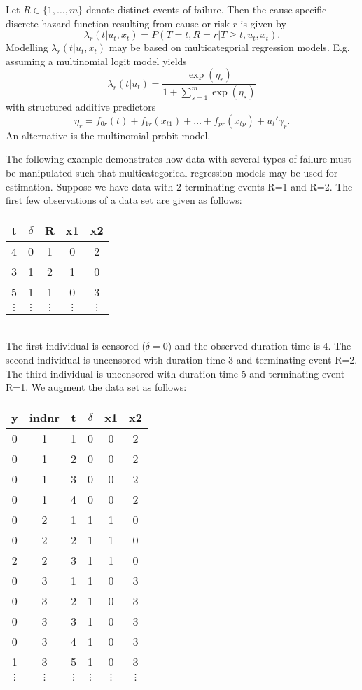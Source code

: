 Let $R \in \{1,\dots,m\}$ denote distinct events of failure. Then
the cause specific discrete hazard function resulting from cause
or risk $r$ is given by
$$
\lambda_{r}(t|u_t,x_t) = P(T=t,R=r|T \geq t, u_t,x_t).
$$
Modelling $\lambda_{r}(t|u_t,x_t)$ may be based on multicategorial
regression models. E.g. assuming a multinomial logit model yields
$$
\lambda_{r}(t|u_t) = \frac{\exp(\eta_{r})}{1+\sum_{s=1}^m
\exp(\eta_s)}
$$
with structured additive predictors
\begin{equation}
\label{gampred3} \eta_{r}=f_{0r}(t) +
f_{1r}(x_{t1})+\dots+f_{pr}(x_{tp})+u_{t}'\gamma_r.
\end{equation}
An alternative is the multinomial probit model.

The following example demonstrates how data with several types of
failure must be manipulated such that multicategorical regression
models may be used for estimation. Suppose we have data with 2
terminating events R=1 and R=2. The first few observations of a
data set are given as follows:
\vspace{0.5cm}\\
\begin{tabular}{c|c|c|c|c}
t & $\delta$ & R & x1 & x2\\\hline\hline 4 & 0    &  1 & 0  &
2\\\hline 3 & 1    &  2 & 1  & 0\\\hline 5 & 1    &  1 & 0  &
3\\\hline
$\vdots$ & $\vdots$ & $\vdots$ & $\vdots$ & $\vdots$\\
\end{tabular}
\vspace{0.5cm}\\
The first individual is censored ($\delta=0$) and the observed
duration time is 4. The second individual is uncensored with
duration time 3 and terminating event R=2. The third individual is
uncensored with duration time 5 and terminating event R=1. We
augment the data set as follows:
\vspace{0.5cm}\\
\begin{tabular}{c|c|c|c|c|c}
y & indnr & t & $\delta$ &  x1 & x2\\\hline\hline
0 &  1  &  1 & 0  &  0 &  2\\
0 &  1  &  2 & 0  &  0 &  2\\
0 &  1  &  3 & 0  &  0 &  2\\
0 &  1  &  4 & 0  &  0 &  2\\\hline
0 &  2  &  1 & 1  &  1 &  0\\
0 &  2  &  2 & 1  &  1 &  0\\
2 &  2  &  3 & 1  &  1 &  0\\\hline
0 &  3  &  1 & 1  &  0 &  3\\
0 &  3  &  2 & 1  &  0 &  3\\
0 &  3  &  3 & 1  &  0 &  3\\
0 &  3  &  4 & 1  &  0 &  3\\
1 &  3  &  5 & 1  &  0 & 3\\\hline
$\vdots$ & $\vdots$ & $\vdots$ & $\vdots$ & $\vdots$ & $\vdots$\\
\end{tabular}
